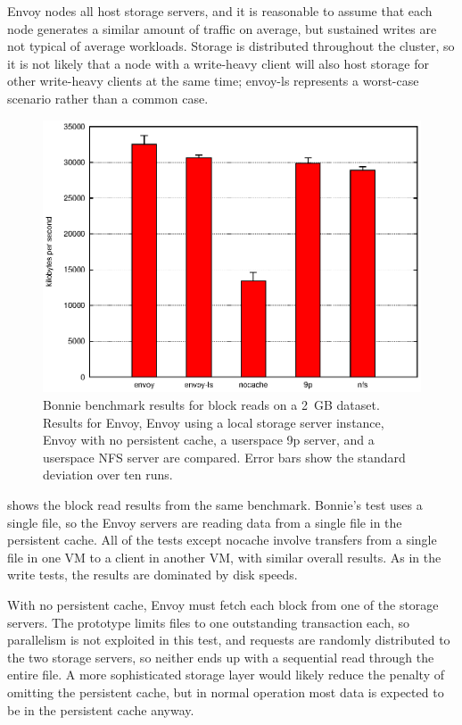 Envoy nodes all host storage servers, and it is reasonable to assume that each node generates a similar amount of traffic on average, but sustained writes are not typical of average workloads. Storage is distributed throughout the cluster, so it is not likely that a node with a write-heavy client will also host storage for other write-heavy clients at the same time; envoy-ls represents a worst-case scenario rather than a common case.

\begin{figure}[t]
\centering
\includegraphics[width=\figwidth]{figures/bonnie-druid1-read}
\caption[Bonnie benchmark results for block reads]{Bonnie benchmark results for block reads on a 2~GB dataset. Results for Envoy, Envoy using a local storage server instance, Envoy with no persistent cache, a userspace 9p server, and a userspace NFS server are compared. Error bars show the standard deviation over ten runs.}
\label{fig:bonnie-druid1-read}
\end{figure}

 shows the block read results from the same benchmark. Bonnie's test uses a single file, so the Envoy servers are reading data from a single file in the persistent cache. All of the tests except nocache involve transfers from a single file in one VM to a client in another VM, with similar overall results. As in the write tests, the results are dominated by disk speeds.

With no persistent cache, Envoy must fetch each block from one of the storage servers. The prototype limits files to one outstanding transaction each, so parallelism is not exploited in this test, and requests are randomly distributed to the two storage servers, so neither ends up with a sequential read through the entire file. A more sophisticated storage layer would likely reduce the penalty of omitting the persistent cache, but in normal operation most data is expected to be in the persistent cache anyway.

